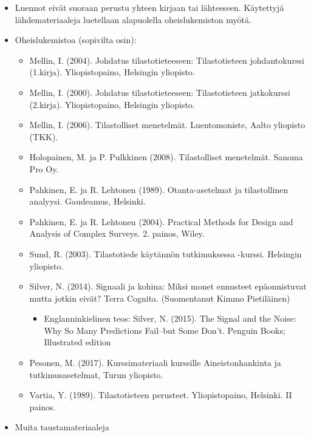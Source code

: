 \documentclass[
]{book}
\providecommand{\tightlist}{%
  \setlength{\itemsep}{0pt}\setlength{\parskip}{0pt}}
\begin{document}
\begin{itemize}
\item
  Luennot eivät suoraan perustu yhteen kirjaan tai lähteeseen. Käytettyjä lähdemateriaaleja luetellaan alapuolella oheislukemiston myötä.
\item
  Oheislukemistoa (sopivilta osin):

  \begin{itemize}
  \tightlist
  \item
    Mellin, I. (2004). Johdatus tilastotieteeseen: Tilastotieteen johdantokurssi (1.kirja). Yliopistopaino, Helsingin yliopisto.
  \item
    Mellin, I. (2000). Johdatus tilastotieteeseen: Tilastotieteen jatkokurssi (2.kirja). Yliopistopaino, Helsingin yliopisto.
  \item
    Mellin, I. (2006). Tilastolliset menetelmät. Luentomoniste, Aalto yliopisto (TKK).
  \item
    Holopainen, M. ja P. Pulkkinen (2008). Tilastolliset menetelmät. Sanoma Pro Oy.
  \item
    Pahkinen, E. ja R. Lehtonen (1989). Otanta-asetelmat ja tilastollinen analyysi. Gaudeamus, Helsinki.
  \item
    Pahkinen, E. ja R. Lehtonen (2004). Practical Methods for Design and Analysis of Complex Surveys. 2. painos, Wiley.
  \item
    Sund, R. (2003). Tilastotiede käytännön tutkimuksessa -kurssi. Helsingin yliopisto.
  \item
    Silver, N. (2014). Signaali ja kohina: Miksi monet ennusteet epäonnistuvat mutta jotkin eivät? Terra Cognita. (Suomentanut Kimmo Pietiläinen)

    \begin{itemize}
    \tightlist
    \item
      Englanninkielinen teos: Silver, N. (2015). The Signal and the Noise: Why So Many Predictions Fail--but Some Don't. Penguin Books; Illustrated edition
    \end{itemize}
  \item
    Pesonen, M. (2017). Kurssimateriaali kurssille Aineistonhankinta ja tutkimusasetelmat, Turun yliopisto.
  \item
    Vartia, Y. (1989). Tilastotieteen perusteet. Yliopistopaino, Helsinki. II painos.
  \end{itemize}
\item
  Muita taustamateriaaleja


\end{itemize}
\end{document}

